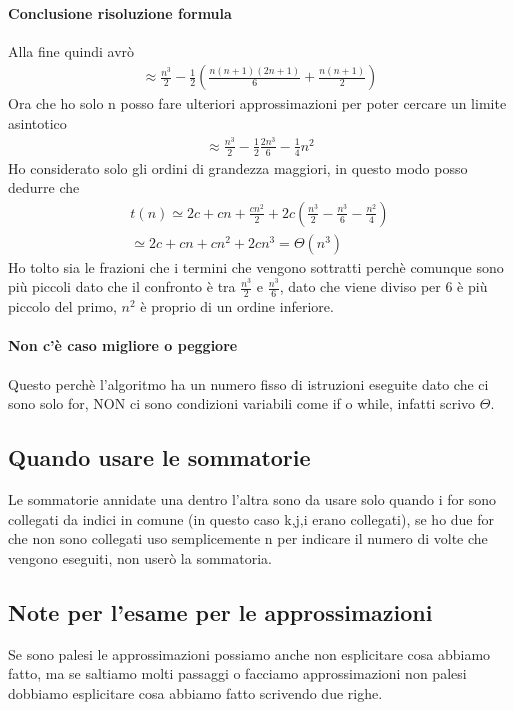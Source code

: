 \paragraph*{Conclusione risoluzione formula} Alla fine quindi avrò
\begin{align*}
    \approx \frac{n^3}{2}-\frac{1}{2}(\frac{n(n+1)(2n+1)}{6}+ 
    \frac{n(n+1)}{2})
\end{align*}
Ora che ho solo n posso fare ulteriori approssimazioni per poter cercare un limite asintotico
\begin{align*}
    \approx \frac{n^3}{2} -\frac{1}{2}\frac{2n^3}{6}-\frac{1}{4}n^2
\end{align*}
Ho considerato solo gli ordini di grandezza maggiori, in questo modo posso dedurre che 
\begin{align*}
    t(n)\simeq 2c+cn+\frac{cn^2}{2} + 2c(\frac{n^3}{2}-\frac{n^3}{6}-\frac{n^2}{4})\\
    \simeq 2c+cn+cn^2+2cn^3 = \Theta(n^3)
\end{align*}
Ho tolto sia le frazioni che i termini che vengono sottratti perchè comunque sono più piccoli dato
che il confronto è tra $\frac{n^3}{2}$ e $\frac{n^3}{6}$, dato che viene diviso per 6 è più piccolo
del primo, $n^2$ è proprio di un ordine inferiore.\\
\paragraph*{Non c'è caso migliore o peggiore} Questo perchè l'algoritmo ha un numero fisso di
istruzioni eseguite dato che ci sono solo for, NON ci sono condizioni variabili come if o while, infatti
scrivo $\Theta$.
\subsection{Quando usare le sommatorie}
Le sommatorie annidate una dentro l'altra sono da usare solo quando i for sono collegati da indici
in comune (in questo caso k,j,i erano collegati), se ho due for che non sono collegati uso semplicemente n per
indicare il numero di volte che vengono eseguiti, non userò la sommatoria.
\subsection{Note per l'esame per le approssimazioni}
Se sono palesi le approssimazioni possiamo anche non esplicitare cosa abbiamo fatto, ma se
saltiamo molti passaggi o facciamo approssimazioni non palesi dobbiamo esplicitare cosa abbiamo fatto scrivendo
due righe.
